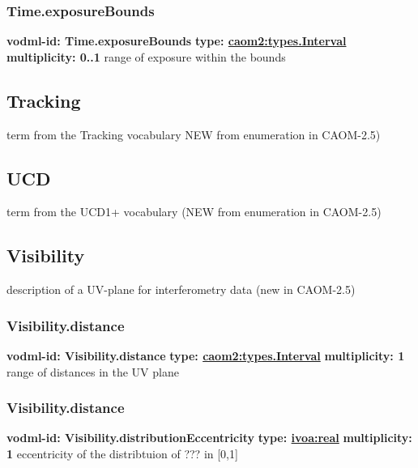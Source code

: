     \subsubsection{Time.exposureBounds}
      \textbf{vodml-id: Time.exposureBounds} \newline
      \textbf{type: \hyperref[sect:types.Interval]{caom2:types.Interval}} \newline
      \textbf{multiplicity: 0..1} \newline
      range of exposure within the bounds

  \subsection{Tracking}
  \label{sect:Tracking}
    term from the Tracking vocabulary NEW from enumeration in CAOM-2.5)

  \subsection{UCD}
  \label{sect:UCD}
    term from the UCD1+ vocabulary (NEW from enumeration in CAOM-2.5)

  \subsection{Visibility}
  \label{sect:Visibility}
    description of a UV-plane for interferometry data (new in CAOM-2.5)

    \subsubsection{Visibility.distance}
      \textbf{vodml-id: Visibility.distance} \newline
      \textbf{type: \hyperref[sect:types.Interval]{caom2:types.Interval}} \newline
      \textbf{multiplicity: 1} \newline
      range of distances in the UV plane

    \subsubsection{Visibility.distance}
      \textbf{vodml-id: Visibility.distributionEccentricity} \newline
      \textbf{type: \hyperref[sect:ivoa]{ivoa:real}} \newline
      \textbf{multiplicity: 1} \newline
      eccentricity of the distribtuion of ??? in [0,1]

